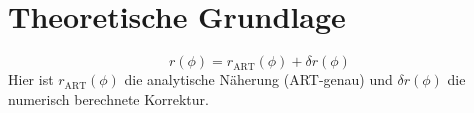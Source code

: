 \section{Theoretische Grundlage}
\[
r(\phi) = r_{\text{ART}}(\phi) + \delta r(\phi)
\]
Hier ist \( r_{\text{ART}}(\phi) \) die analytische Näherung (ART-genau) und \( \delta r(\phi) \) die numerisch berechnete Korrektur.
